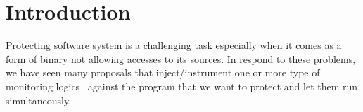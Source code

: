 \section{Introduction} 
\label{sec:intro}

Protecting software system is a challenging task especially when it comes as a
form of binary not allowing accesses to its sources.
%
In respond to these problems, we have seen many proposals that
inject/instrument one or more type of monitoring logics~\cite{cfi, memcheck,
dft} against the program that we want to protect and let them run
simultaneously.



